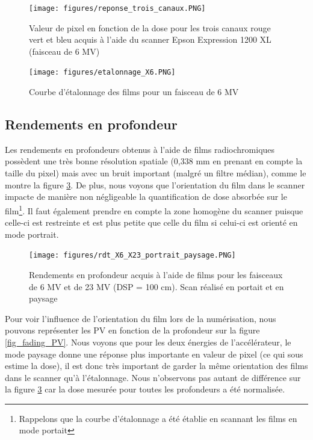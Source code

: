 \documentclass{book}
\begin{document}
\begin{figure}[h]
  \centering
  \texttt{[image: figures/reponse\_trois\_canaux.PNG]}
  \caption{Valeur de pixel en fonction de la dose pour les trois canaux rouge vert et bleu acquis à l'aide du scanner Epson Expression 1200 XL (faisceau de 6 MV)}
  \label{fig_reponse_canaux}
\end{figure}

\begin{figure}[h]
  \centering
  \texttt{[image: figures/etalonnage\_X6.PNG]}
  \caption{Courbe d'étalonnage des films pour un faisceau de 6 MV}
  \label{fig_courbe_etalonnage}
\end{figure}

\newpage
\subsection{Rendements en profondeur}

Les rendements en profondeurs obtenus à l'aide de films radiochromiques possèdent une très bonne résolution spatiale (0,338 mm en prenant en compte la taille du pixel) mais avec un bruit important (malgré un filtre médian), comme le montre la figure \ref*{fig_rdt_films_X6_X23}. De plus, nous voyons que l'orientation du film dans le scanner impacte de manière non négligeable la quantification de dose absorbée sur le film\footnote{Rappelons que la courbe d'étalonnage a été établie en scannant les films en mode portait}. Il faut également prendre en compte la zone homogène du scanner puisque celle-ci est restreinte et est plus petite que celle du film si celui-ci est orienté en mode portrait. 

\begin{figure}[h]
  \centering
  \texttt{[image: figures/rdt\_X6\_X23\_portrait\_paysage.PNG]}
  \caption{Rendements en profondeur acquis à l'aide de films pour les faisceaux de 6 MV et de 23 MV (DSP = 100 cm). Scan réalisé en portait et en paysage}
  \label{fig_rdt_films_X6_X23}
\end{figure}

Pour voir l'influence de l'orientation du film lors de la numérisation, nous pouvons représenter les PV en fonction de la profondeur sur la figure \ref*{fig_fading_PV}. Nous voyons que pour les deux énergies de l'accélérateur, le mode paysage donne une réponse plus importante en valeur de pixel (ce qui sous estime la dose), il est donc très important de garder la même orientation des films dans le scanner qu'à l'étalonnage. Nous n'observons pas autant de différence sur la figure \ref*{fig_rdt_films_X6_X23} car la dose mesurée pour toutes les profondeurs a été normalisée.
\end{document}
